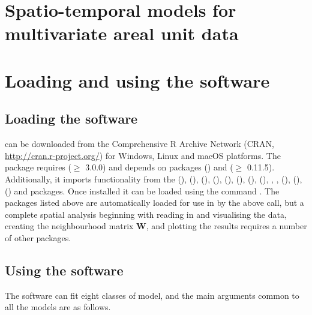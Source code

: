 \documentclass[article, nojss]{jss}
\begin{document}
\section{Spatio-temporal models for multivariate areal unit data}\label{section3}



\section{Loading and using the software}\label{section4}

\subsection{Loading the software}
 can be downloaded from the Comprehensive R Archive Network (CRAN, \url{http://cran.r-project.org/}) for Windows, Linux and macOS platforms.  The package requires  ($\geq$ 3.0.0) and depends on packages  (\citealp{mass2002}) and  ($\geq$ 0.11.5). Additionally, it imports functionality from the  (\citealp{carbayesdata}),   (\citealp{coda2006}),  (\citealp{dplyr2015}),  (\citealp{gtools}),  (\citealp{leaflet}),   (\citealp{matrixcalc2012}),  (\citealp{bivand2013}),  (\citealp{spam2010}), , ,  (\citealp{testthat}),  (\citealp{truncdist2012}),  (\citealp{truncnorm2014}) and  packages. Once installed it can be loaded using the command . The packages listed above are automatically loaded for use in  by the above call, but a complete spatial analysis beginning with reading in and visualising the data, creating the neighbourhood matrix $\mathbf{W}$, and plotting the results requires a number of other packages.


\subsection{Using the software}
The software can fit  eight classes of model, and the main arguments common to all the models are as follows.
\end{document}
